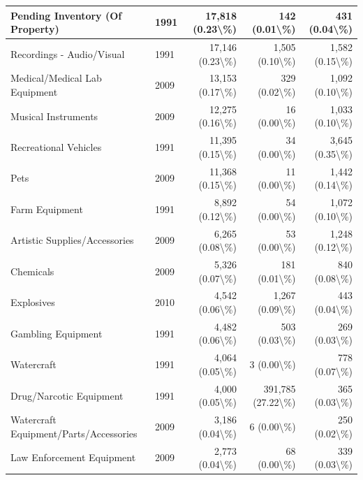 \documentclass[
]{krantz}
\begin{document}
\begin{longtable}[t]{l|l|r|r|r}
\hline
Pending Inventory (Of Property) & 1991 & 17,818 (0.23\textbackslash{}\%) & 142 (0.01\textbackslash{}\%) & 431 (0.04\textbackslash{}\%)\\
\hline
Recordings - Audio/Visual & 1991 & 17,146 (0.23\textbackslash{}\%) & 1,505 (0.10\textbackslash{}\%) & 1,582 (0.15\textbackslash{}\%)\\
\hline
Medical/Medical Lab Equipment & 2009 & 13,153 (0.17\textbackslash{}\%) & 329 (0.02\textbackslash{}\%) & 1,092 (0.10\textbackslash{}\%)\\
\hline
Musical Instruments & 2009 & 12,275 (0.16\textbackslash{}\%) & 16 (0.00\textbackslash{}\%) & 1,033 (0.10\textbackslash{}\%)\\
\hline
Recreational Vehicles & 1991 & 11,395 (0.15\textbackslash{}\%) & 34 (0.00\textbackslash{}\%) & 3,645 (0.35\textbackslash{}\%)\\
\hline
Pets & 2009 & 11,368 (0.15\textbackslash{}\%) & 11 (0.00\textbackslash{}\%) & 1,442 (0.14\textbackslash{}\%)\\
\hline
Farm Equipment & 1991 & 8,892 (0.12\textbackslash{}\%) & 54 (0.00\textbackslash{}\%) & 1,072 (0.10\textbackslash{}\%)\\
\hline
Artistic Supplies/Accessories & 2009 & 6,265 (0.08\textbackslash{}\%) & 53 (0.00\textbackslash{}\%) & 1,248 (0.12\textbackslash{}\%)\\
\hline
Chemicals & 2009 & 5,326 (0.07\textbackslash{}\%) & 181 (0.01\textbackslash{}\%) & 840 (0.08\textbackslash{}\%)\\
\hline
Explosives & 2010 & 4,542 (0.06\textbackslash{}\%) & 1,267 (0.09\textbackslash{}\%) & 443 (0.04\textbackslash{}\%)\\
\hline
Gambling Equipment & 1991 & 4,482 (0.06\textbackslash{}\%) & 503 (0.03\textbackslash{}\%) & 269 (0.03\textbackslash{}\%)\\
\hline
Watercraft & 1991 & 4,064 (0.05\textbackslash{}\%) & 3 (0.00\textbackslash{}\%) & 778 (0.07\textbackslash{}\%)\\
\hline
Drug/Narcotic Equipment & 1991 & 4,000 (0.05\textbackslash{}\%) & 391,785 (27.22\textbackslash{}\%) & 365 (0.03\textbackslash{}\%)\\
\hline
Watercraft Equipment/Parts/Accessories & 2009 & 3,186 (0.04\textbackslash{}\%) & 6 (0.00\textbackslash{}\%) & 250 (0.02\textbackslash{}\%)\\
\hline
Law Enforcement Equipment & 2009 & 2,773 (0.04\textbackslash{}\%) & 68 (0.00\textbackslash{}\%) & 339 (0.03\textbackslash{}\%)\\

\end{longtable}
\end{document}
